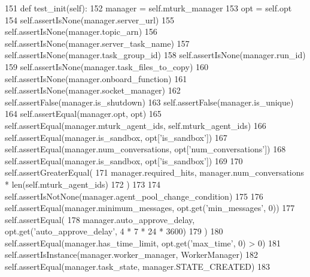 \begin{DoxyCode}
151     \textcolor{keyword}{def }test\_init(self):
152         manager = self.mturk\_manager
153         opt = self.opt
154         self.assertIsNone(manager.server\_url)
155         self.assertIsNone(manager.topic\_arn)
156         self.assertIsNone(manager.server\_task\_name)
157         self.assertIsNone(manager.task\_group\_id)
158         self.assertIsNone(manager.run\_id)
159         self.assertIsNone(manager.task\_files\_to\_copy)
160         self.assertIsNone(manager.onboard\_function)
161         self.assertIsNone(manager.socket\_manager)
162         self.assertFalse(manager.is\_shutdown)
163         self.assertFalse(manager.is\_unique)
164         self.assertEqual(manager.opt, opt)
165         self.assertEqual(manager.mturk\_agent\_ids, self.mturk\_agent\_ids)
166         self.assertEqual(manager.is\_sandbox, opt[\textcolor{stringliteral}{'is\_sandbox'}])
167         self.assertEqual(manager.num\_conversations, opt[\textcolor{stringliteral}{'num\_conversations'}])
168         self.assertEqual(manager.is\_sandbox, opt[\textcolor{stringliteral}{'is\_sandbox'}])
169 
170         self.assertGreaterEqual(
171             manager.required\_hits, manager.num\_conversations * len(self.mturk\_agent\_ids)
172         )
173 
174         self.assertIsNotNone(manager.agent\_pool\_change\_condition)
175 
176         self.assertEqual(manager.minimum\_messages, opt.get(\textcolor{stringliteral}{'min\_messages'}, 0))
177         self.assertEqual(
178             manager.auto\_approve\_delay, opt.get(\textcolor{stringliteral}{'auto\_approve\_delay'}, 4 * 7 * 24 * 3600)
179         )
180         self.assertEqual(manager.has\_time\_limit, opt.get(\textcolor{stringliteral}{'max\_time'}, 0) > 0)
181         self.assertIsInstance(manager.worker\_manager, WorkerManager)
182         self.assertEqual(manager.task\_state, manager.STATE\_CREATED)
183 
\end{DoxyCode}
\mbox{\label{classparlai_1_1mturk_1_1core_1_1test_1_1test__mturk__manager_1_1InitTestMTurkManager_adf2acf81be629e8f652e7ccf07e7d8b3}} 
